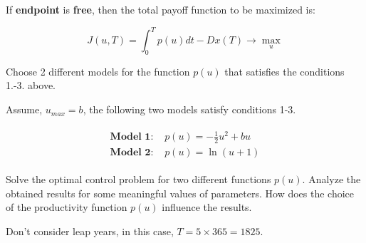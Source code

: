 \documentclass{article}
\begin{document}
If \textbf{endpoint} is \textbf{free}, then the total payoff function to be maximized is:

\begin{equation}\label{eq:optfunction_with_terminal_cost}
    J(u,T)=\int_{0}^{T}p(u)dt-Dx(T)\rightarrow \max_{u} 
\end{equation}

 Choose 2 different models for the function $p(u)$ that satisfies the conditions 1.-3. above.

Assume, $u_{max}=b$, the following two models satisfy conditions 1-3.

\begin{gather}
    \begin{aligned}
        \textbf{Model 1: } & p(u)=-\frac{1}{2}u^2+bu\\
        \textbf{Model 2: } & p(u)=\ln (u+1) 
    \end{aligned}
\end{gather}

 Solve the optimal control problem for two different functions $p(u)$. Analyze the obtained results for some meaningful values of parameters. How does the choice of the productivity function $p(u)$ influence the results.

Don't consider leap years, in this case, $T=5\times 365=1825.$
\end{document}
